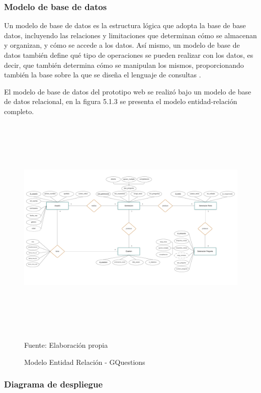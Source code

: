 \documentclass[../Main.tex]{subfiles}
\begin{document}
    \subsubsection{Modelo de base de datos}
    \begin{justify}
    Un modelo de base de datos es la estructura lógica que adopta la base de base datos, incluyendo las relaciones y limitaciones que determinan cómo se almacenan y organizan, y cómo se accede a los datos. Así mismo, un modelo de base de datos también define qué tipo de operaciones se pueden realizar con los datos, es decir, que también determina cómo se manipulan los mismos, proporcionando también la base sobre la que se diseña el lenguaje de consultas \cite{54}. %
    
    El modelo de base de datos del prototipo web se realizó bajo un modelo de base de datos relacional, en la figura 5.1.3 se presenta el modelo entidad-relación completo.
    \end{justify}
    
    \begin{figure}[H]
	\begin{Center}
		\includegraphics[width=6.4in,height=4.3in]{Images/Diagrama-ER-DBMS.png}
	    \caption{Modelo Entidad Relación - GQuestions}
	    Fuente: Elaboración propia
        \label{fig:section}
	\end{Center}
    \end{figure}
    
    \newpage
    \subsubsection{Diagrama de despliegue}
    
\end{document}
